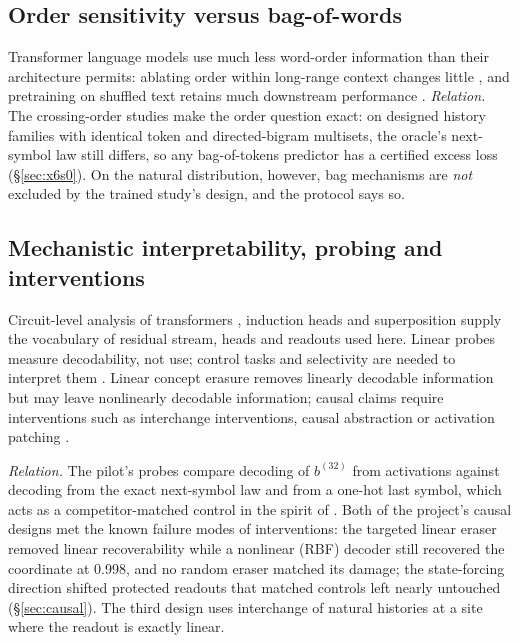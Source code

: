 \documentclass[11pt,a4paper]{article}
\newcommand{\bel}[1]{b^{(#1)}}
\DeclareRobustCommand{\_}{\ifmmode\origunderscore\else\textunderscore\allowbreak\fi}
\begin{document}
\subsection{Order sensitivity versus bag-of-words}
Transformer language models use much less word-order information than their architecture
permits: ablating order within long-range context changes little \citep{oconnor2021context}, and
pretraining on shuffled text retains much downstream performance \citep{sinha2021masked}.
\emph{Relation.} The crossing-order studies make the order question exact: on designed history
families with identical token and directed-bigram multisets, the oracle's next-symbol law still
differs, so any bag-of-tokens predictor has a certified excess loss (\S\ref{sec:x6s0}). On the
natural distribution, however, bag mechanisms are \emph{not} excluded by the trained study's
design, and the protocol says so.

\subsection{Mechanistic interpretability, probing and interventions}
Circuit-level analysis of transformers \citep{elhage2021framework}, induction heads
\citep{olsson2022induction} and superposition \citep{elhage2022superposition} supply the
vocabulary of residual stream, heads and readouts used here. Linear probes \citep{alain2016probes}
measure decodability, not use; control tasks and selectivity are needed to interpret them
\citep{hewitt2019control,belinkov2022probing}. Linear concept erasure
\citep{ravfogel2020inlp,belrose2023leace} removes linearly decodable information but may leave
nonlinearly decodable information; causal claims require interventions such as interchange
interventions, causal abstraction or activation patching
\citep{geiger2021causal,meng2022locating,zhang2024patching,heimersheim2024patching}.

\emph{Relation.} The pilot's probes compare decoding of $\bel{32}$ from activations against
decoding from the exact next-symbol law and from a one-hot last symbol, which acts as a
competitor-matched control in the spirit of \citet{hewitt2019control}. Both of the project's
causal designs met the known failure modes of interventions: the targeted linear eraser
removed linear recoverability while a nonlinear (RBF) decoder still recovered the coordinate at
0.998, and no random eraser matched its damage; the state-forcing direction shifted protected
readouts that matched controls left nearly untouched (\S\ref{sec:causal}). The third design
uses interchange of natural histories at a site where the readout is exactly linear.
\end{document}
